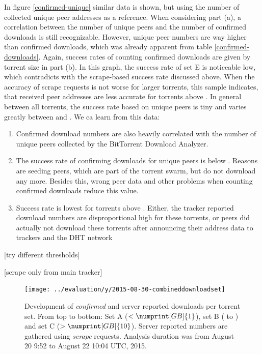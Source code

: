 \documentclass[10pt, a4paper, twoside, headsepline]{scrbook}
\renewcommand{\_}{\origunderscore\allowbreak}
\newcommand{\range}{from August 20 9:52 to August 22 10:04 UTC, 2015} %
\begin{document}
In figure \ref{confirmed-unique} similar data is shown, but using the number of collected unique peer addresses as a reference. When considering part (a), a correlation between the number of unique peers and the number of confirmed downloads is still recognizable. However, unique peer numbers are way higher than confirmed downloads, which was already apparent from table \ref{confirmed-downloads}. Again, success rates of counting confirmed downloads are given by torrent size in part (b). In this graph, the success rate of set E is noticeable low, which contradicts with the scrape-based success rate discussed above. When the accuracy of scrape requests is not worse for larger torrents, this sample indicates, that received peer addresses are less accurate for torrents above . In general between all torrents, the success rate based on unique peers is tiny and varies greatly between  and . We ca learn from this data:
\begin{enumerate}
\item Confirmed download numbers are also heavily correlated with the number of unique peers collected by the BitTorrent Download Analyzer.
\item The success rate of confirming downloads for unique peers is below . Reasons are seeding peers, which are part of the torrent swarm, but do not download any more. Besides this, wrong peer data and other problems when counting confirmed downloads reduce this value.
\item Success rate is lowest for torrents above . Either, the tracker reported download numbers are disproportional high for these torrents, or peers did actually not download these torrents after announcing their address data to trackers and the DHT network
\end{enumerate}

[try different thresholds]

[scrape only from main tracker]

\begin{figure}
\centering
\texttt{[image: ../evaluation/y/2015-08-30\_20-combined\_download\_set]}
\caption[Development of confirmed and reported downloads per torrent set]{Development of \emph{confirmed} and server reported downloads per torrent set. From top to bottom: Set A ($<\numprint[GB]{1}$), set B ( to ) and set C ($>\numprint[GB]{10}$). Server reported numbers are gathered using \emph{scrape} requests. Analysis duration was \range.}
\label{download-history}
\end{figure}
\end{document}
